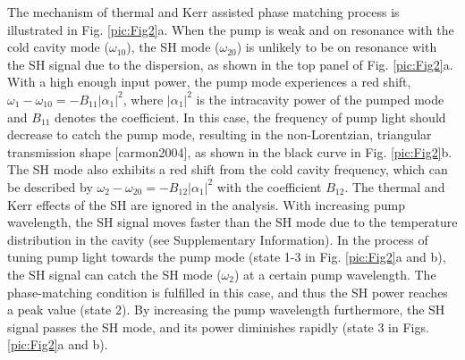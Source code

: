 \documentclass[a4paper,8pt,hyperref, twocolumn]{article}
\begin{document}
The mechanism of thermal and Kerr assisted phase matching process is illustrated in Fig. \ref{pic:Fig2}a. 
When the pump is weak and on resonance with the cold cavity mode ($\omega_{10}$), the SH mode ($\omega_{20}$) is unlikely to be on resonance with the SH signal due to the dispersion, as shown in the top panel of Fig. \ref{pic:Fig2}a. 
With a high enough input power, the pump mode experiences a red shift, $\omega_1-\omega_{10} = -B_{11}|\alpha_1|^2$, where $|\alpha_1|^2$ is the intracavity power of the pumped mode and $B_{11}$ denotes the coefficient. 
In this case, the frequency of pump light should decrease to catch the pump mode, resulting in the non-Lorentzian, triangular transmission shape [carmon2004], as shown in the black curve in Fig. \ref{pic:Fig2}b.
The SH mode also exhibits a red shift from the cold cavity frequency, which can be described by $\omega_2-\omega_{20} = -B_{12}|\alpha_1|^2$ with the coefficient $B_{12}$. 
The thermal and Kerr effects of the SH are ignored in the analysis.
With increasing pump wavelength, the SH signal moves faster than the SH mode due to the temperature distribution in the cavity (see Supplementary Information).
In the process of tuning pump light towards the pump mode (state 1-3 in Fig. \ref{pic:Fig2}a and b), the SH signal can catch the SH mode ($\omega_2$) at a certain pump wavelength. 
The phase-matching condition is fulfilled in this case, and thus the SH power reaches a peak value (state 2).
By increasing the pump wavelength furthermore, the SH signal passes the SH mode, and its power diminishes rapidly (state 3 in Figs. \ref{pic:Fig2}a and b). 

\end{document}

